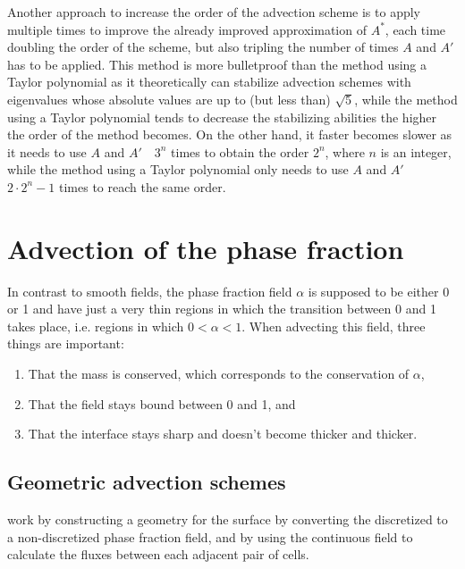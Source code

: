 Another approach to increase the order of the advection scheme is to apply \BFECC multiple times to improve the already improved approximation of $A^*$, each time doubling the order of the scheme, but also tripling the number of times $A$ and $A'$ has to be applied. This method is more bulletproof than the method using a Taylor polynomial as it theoretically can stabilize advection schemes with eigenvalues whose absolute values are up to (but less than) $\sqrt{5}$, while the method using a Taylor polynomial tends to decrease the stabilizing abilities the higher the order of the method becomes. On the other hand, it faster becomes slower as it needs to use $A$ and $A'$\ \ $3^n$ times to obtain the order $2^n$, where $n$ is an integer, while the method using a Taylor polynomial only needs to use $A$ and $A'$\ \ $2\cdot 2^n - 1$ times to reach the same order.

\section{Advection of the phase fraction}

\label{sec:advection_of_phase_fraction}

In contrast to smooth fields, the phase fraction field $\alpha$ is supposed to be either 0 or 1 and have just a very thin regions in which the transition between 0 and 1 takes place, i.e. regions in which $0 < \alpha < 1$. When advecting this field, three things are important:

\begin{enumerate}
\item That the mass is conserved, which corresponds to the conservation of $\alpha$,
\item That the field stays bound between 0 and 1, and
\item That the interface stays sharp and doesn't become thicker and thicker.
\end{enumerate}

\subsection{Geometric advection schemes}

 work by constructing a geometry for the surface by converting the discretized  to a non-discretized phase fraction field, and by using the continuous field to calculate the fluxes between each adjacent pair of cells.

